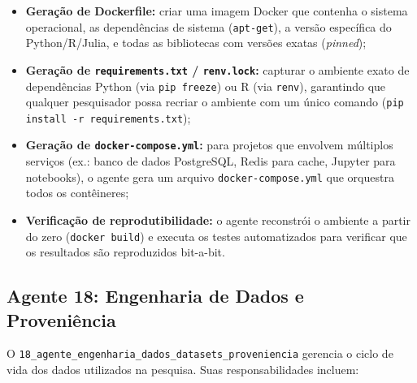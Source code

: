 \begin{itemize}
    \item \textbf{Geração de Dockerfile:} criar uma imagem Docker
    que contenha o sistema operacional, as dependências de sistema
    (\texttt{apt-get}), a versão específica do Python/R/Julia, e
    todas as bibliotecas com versões exatas (\textit{pinned});

    \item \textbf{Geração de \texttt{requirements.txt} /
    \texttt{renv.lock}:} capturar o ambiente exato de dependências
    Python (via \texttt{pip freeze}) ou R (via \texttt{renv}),
    garantindo que qualquer pesquisador possa recriar o ambiente
    com um único comando (\texttt{pip install -r requirements.txt});

    \item \textbf{Geração de \texttt{docker-compose.yml}:} para
    projetos que envolvem múltiplos serviços (ex.: banco de dados
    PostgreSQL, Redis para cache, Jupyter para notebooks), o agente
    gera um arquivo \texttt{docker-compose.yml} que orquestra todos
    os contêineres;

    \item \textbf{Verificação de reprodutibilidade:} o agente
    reconstrói o ambiente a partir do zero (\texttt{docker build})
    e executa os testes automatizados para verificar que os
    resultados são reproduzidos bit-a-bit.
\end{itemize}

\subsection{Agente 18: Engenharia de Dados e Proveniência}
\label{sec:agente18}

O \texttt{18\_agente\_engenharia\_dados\_datasets\_proveniencia}
gerencia o ciclo de vida dos dados utilizados na pesquisa. Suas
responsabilidades incluem:

